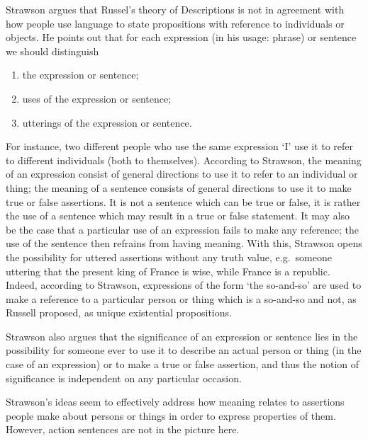 \documentclass{article}
\begin{document}
\maketitle

Strawson argues that Russel's theory of Descriptions is not in agreement with
how people use language to state propositions with reference to individuals
or objects. He points out that for each expression (in his usage: phrase) or 
sentence we should distinguish
\begin{enumerate}
\item the expression or sentence;
\item uses of the expression or sentence;
\item utterings of the expression or sentence.
\end{enumerate}
For instance, two different
people who use the same expression `I' use it to refer to different individuals
(both to themselves). 
According to Strawson, the meaning of an expression consist of general 
directions to use it to refer to an individual or thing; the meaning of a
sentence consists of general directions to use it to make true or false 
assertions. It is not a sentence which can be true or false, it is rather the
use of a sentence which may result in a true or false statement. It may also be
the case that a particular use of an expression fails to make any reference; the
use of the sentence then refrains from having meaning. With this, Strawson opens
the possibility for uttered assertions without any truth value, e.g.~someone
uttering that the present king of France is wise, while France is a republic.
Indeed, according to Strawson, expressions of the form `the so-and-so' are used
to make a reference to a particular person or thing which is a so-and-so and
not, as Russell proposed, as unique existential propositions.

Strawson also argues that the significance of an expression or sentence lies
in the possibility for someone ever to use it to describe an actual person or 
thing (in the case of an expression) or to make a true or false assertion, and
thus the notion of significance is independent on any particular occasion.

Strawson's ideas seem to effectively address how meaning relates to assertions
people make about persons or things in order to express properties of them.
However, action sentences are not in the picture here. 
\end{document}
